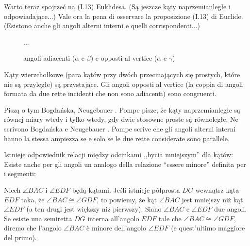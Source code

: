Warto teraz spojrzeć na (I.13) Euklidesa. %
(Są jeszcze kąty naprzemianległe i odpowiadające...) %
Vale ora la pena di osservare la proposizione (I.13) di Euclide. %
(Esistono anche gli angoli alterni interni e quelli corrispondenti...) %

\begin{figure}[H] \centering
...
    \caption{kąty przyległe ($\alpha$ i $\beta$) oraz wierzchołkowe ($\alpha$ i $\gamma$)} %
    \caption{angoli adiacenti ($\alpha$ e $\beta$) e opposti al vertice ($\alpha$ e $\gamma$)} %
\end{figure}

\begin{proposition}
    Kąty wierzchołkowe (para kątów przy dwóch przecinających się prostych, które nie są przyległe) są przystające. %
    Gli angoli opposti al vertice (la coppia di angoli formata da due rette incidenti che non sono adiacenti) sono congruenti. %
\end{proposition}

Piszą o tym Bogdańska, Neugebauer \cite[s. 6]{neugebauer_2018}. %
Pompe \cite[s. 5]{pompe_2022} pisze, że kąty naprzemianległe są równej miary wtedy i tylko wtedy, gdy dwie stosowne proste są równoległe. %
Ne scrivono Bogdańska e Neugebauer \cite[p. 6]{neugebauer_2018}. %
Pompe \cite[p. 5]{pompe_2022} scrive che gli angoli alterni interni hanno la stessa ampiezza se e solo se le due rette considerate sono parallele. %


Istnieje odpowiednik relacji między odcinkami ,,bycia mniejszym'' dla kątów: %
Esiste anche per gli angoli un analogo della relazione ``essere minore'' definita per i segmenti: %

\begin{definition}
    Niech $\angle BAC$ i $\angle EDF$ będą kątami. %
    Jeśli istnieje półprosta $DG$ wewnątrz kąta $EDF$ taka, że $\angle BAC \cong \angle GDF$, to powiemy, że kąt $\angle BAC$ jest mniejszy niż kąt $\angle EDF$ (a ten drugi jest większy niż pierwszy). %
    Siano $\angle BAC$ e $\angle EDF$ due angoli. %
    Se esiste una semiretta $DG$ interna all'angolo $EDF$ tale che $\angle BAC \cong \angle GDF$, diremo che l'angolo $\angle BAC$ è minore dell'angolo $\angle EDF$ (e quest'ultimo maggiore del primo). %
\end{definition}

